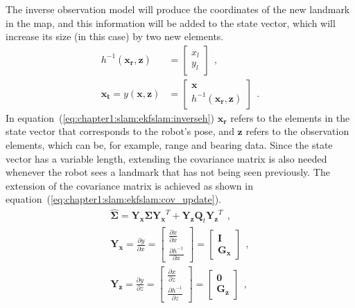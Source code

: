 The inverse observation model will produce the coordinates of the new landmark in the map, and this information will be added to the state vector, which will increase its size (in this case) by two new elements.
\begin{align}
    h^{-1}\left(\bm{x_r}, \bm{z}\right) &= \begin{bmatrix}
        x_l \\ y_l
    \end{bmatrix}~~,
    \label{eq:chapter1:slam:ekfslam:inverseh}\\
    \bm{x_t} = y\left(\bm{x}, \bm{z}\right) &= \begin{bmatrix}
        \bm{x} \\ h^{-1}\left(\bm{x_r}, \bm{z}\right)
    \end{bmatrix}~~.
    \label{eq:chapter1:slam:ekfslam:extension_y}
\end{align}
In equation~(\ref{eq:chapter1:slam:ekfslam:inverseh}) $\bm{x_r}$ refers to the elements in the state vector that corresponds to the robot's pose, and $\bm{z}$ refers to the observation elements, which can be, for example, range and bearing data. Since the state vector has a variable length, extending the covariance matrix is also needed whenever the robot sees a landmark that has not being seen previously. The extension of the covariance matrix is achieved as shown in equation~(\ref{eq:chapter1:slam:ekfslam:cov_update}).
\begin{align}
    \hat{\bm{\Sigma}} = \bm{Y_x} \bm{\Sigma} \bm{Y_x}^T + \bm{Y_z} \bm{Q}_t \bm{Y_z}^T~~,
    \label{eq:chapter1:slam:ekfslam:cov_update}\\
    \bm{Y_x} = \frac{\partial y}{\partial x} = \begin{bmatrix}
        \frac{\partial x}{\partial x} \\ \frac{\partial h^{-1}}{\partial x}
    \end{bmatrix} = \begin{bmatrix}
    \bm{I} \\ \bm{G_x}
    \end{bmatrix}~~,
    \label{eq:chapter1:slam:ekfslam:yx}\\
    \bm{Y_z} = \frac{\partial y}{\partial z} = \begin{bmatrix}
        \frac{\partial x}{\partial z} \\ \frac{\partial h^{-1}}{\partial z}
    \end{bmatrix} = \begin{bmatrix}
        \bm{0} \\ \bm{G_z}
    \end{bmatrix}~~,
    \label{eq:chapter1:slam:ekfslam:yz}
\end{align}
